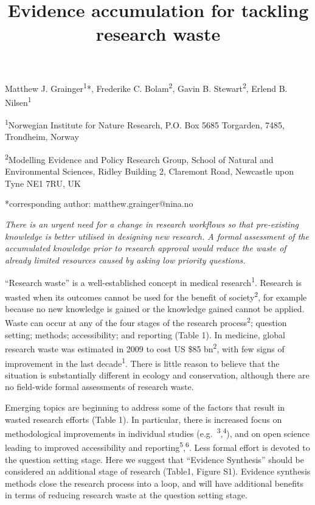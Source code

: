 \documentclass[]{article}
\title{Evidence accumulation for tackling research waste}
\author{}
\date{}
\begin{document}
\maketitle

Matthew J. Grainger\textsuperscript{1}*, Frederike C.
Bolam\textsuperscript{2}, Gavin B. Stewart\textsuperscript{2}, Erlend B.
Nilsen\textsuperscript{1}

\textsuperscript{1}Norwegian Institute for Nature Research, P.O. Box
5685 Torgarden, 7485, Trondheim, Norway

\textsuperscript{2}Modelling Evidence and Policy Research Group, School
of Natural and Environmental Sciences, Ridley Building 2, Claremont
Road, Newcastle upon Tyne NE1 7RU, UK

*corresponding author: matthew.grainger@nina.no

\emph{There is an urgent need for a change in research workflows so that
pre-existing knowledge is better utilised in designing new research. A
formal assessment of the accumulated knowledge prior to research
approval would reduce the waste of already limited resources caused by
asking low priority questions.}

``Research waste'' is a well-established concept in medical
research\textsuperscript{1}. Research is wasted when its outcomes cannot
be used for the benefit of society\textsuperscript{2}, for example
because no new knowledge is gained or the knowledge gained cannot be
applied. Waste can occur at any of the four stages of the research
process\textsuperscript{2}; question setting; methods; accessibility;
and reporting (Table 1). In medicine, global research waste was
estimated in 2009 to cost US \$85 bn\textsuperscript{2}, with few signs
of improvement in the last decade\textsuperscript{1}. There is little
reason to believe that the situation is substantially different in
ecology and conservation, although there are no field-wide formal
assessments of research waste.

Emerging topics are beginning to address some of the factors that result
in wasted research efforts (Table 1). In particular, there is increased
focus on methodological improvements in individual studies
(e.g.~\textsuperscript{3},\textsuperscript{4}), and on open science
leading to improved accessibility and
reporting\textsuperscript{5},\textsuperscript{6}. Less formal effort is
devoted to the question setting stage. Here we suggest that ``Evidence
Synthesis'' should be considered an additional stage of research
(Table1, Figure S1). Evidence synthesis methods close the research
process into a loop, and will have additional benefits in terms of
reducing research waste at the question setting stage.
\end{document}
